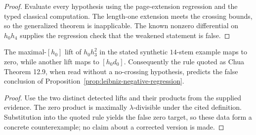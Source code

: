 \begin{proof}
  Evaluate every hypothesis using the page-extension regression and the typed
  classical computation.  The length-one extension meets the crossing bounds,
  so the generalized theorem is inapplicable.  The known nonzero differential
  on $h_0h_4$ supplies the regression check that the weakened statement is
  false.
\end{proof}

\begin{proposition}
  \label{prop:chua-rule-counterexample}
  \notready
  The maximal-$[h_0]$ lift of $h_0h_3^2$ in the stated synthetic $14$-stem
  example maps to zero, while another lift maps to $[h_0d_0]$.  Consequently
  the rule quoted as Chua Theorem 12.9, when read without a no-crossing
  hypothesis, predicts the false conclusion of
  Proposition~\ref{prop:leibniz-negative-regression}.
\end{proposition}

\begin{proof}
  Use the two distinct detected lifts and their products from the supplied
  evidence.  The zero product is maximally $\lambda$-divisible under the cited
  definition.  Substitution into the quoted rule yields the false zero target,
  so these data form a concrete counterexample; no claim about a corrected
  version is made.
\end{proof}

